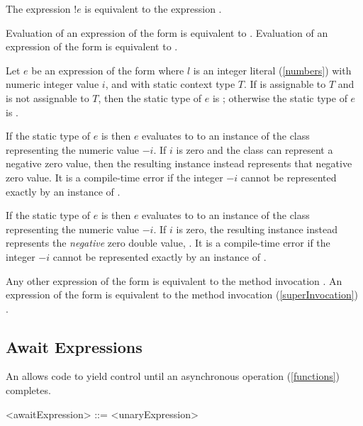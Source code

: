 \documentclass[makeidx]{article}
\begin{document}
\LMHash{}%
The expression $!e$ is equivalent to the expression .

\LMHash{}%
Evaluation of an expression of the form  is equivalent to .
Evaluation of an expression of the form  is equivalent to .

\LMHash{}%
Let $e$ be an expression of the form 
where $l$ is an integer literal (\ref{numbers}) with numeric integer value $i$,
and with static context type $T$.
If  is assignable to $T$ and  is not assignable to $T$,
then the static type of $e$ is ;
otherwise the static type of $e$ is .

\LMHash{}%
If the static type of $e$ is  then $e$ evaluates to
to an instance of the  class representing the numeric value $-i$.
If $i$ is zero and the  class can represent a negative zero value,
then the resulting instance instead represents that negative zero value.
It is a compile-time error if the integer $-i$ cannot be represented
exactly by an instance of .

\LMHash{}%
If the static type of $e$ is  then $e$ evaluates to
to an instance of the  class representing the numeric value $-i$.
If $i$ is zero, the resulting instance instead represents the
\emph{negative} zero double value, .
It is a compile-time error if the integer $-i$ cannot be represented
exactly by an instance of .

\LMHash{}%
Any other expression of the form  is equivalent to the method invocation .
An expression of the form  is equivalent to the method invocation (\ref{superInvocation}) .


\subsection{Await Expressions}

\LMHash{}%
An  allows code to yield control until an asynchronous operation (\ref{functions}) completes.

\begin{grammar}
<awaitExpression> ::= \AWAIT{} <unaryExpression>
\end{grammar}
\end{document}
